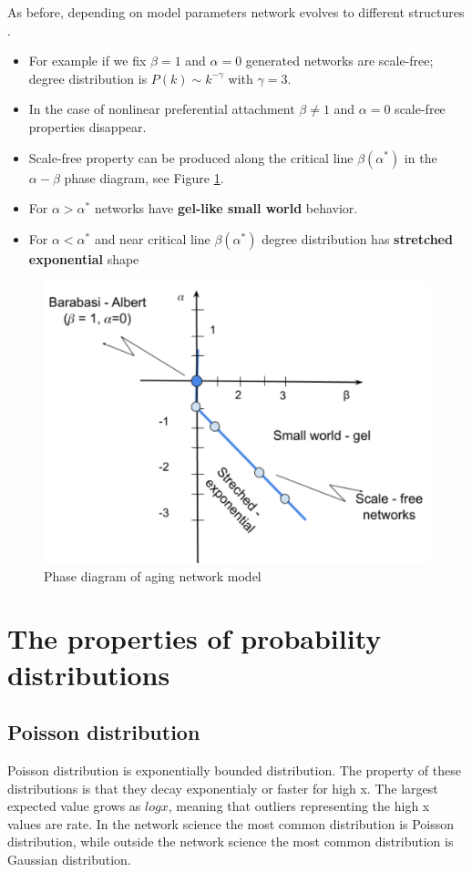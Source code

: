 As before, depending on model parameters network evolves to different structures \cite{hajra2004}.  
\begin{itemize}
	\item For example if we fix $\beta=1$ and $\alpha=0$ generated networks are scale-free; degree distribution is $P(k) \sim k^{-\gamma}$ with $\gamma=3$.
	\item In the case of nonlinear preferential attachment $\beta \neq 1$ and $\alpha=0$ scale-free properties disappear. 
	\item Scale-free property can be produced along the critical line $\beta(\alpha^{*})$ in the $\alpha-\beta$ phase diagram, see Figure \ref{fig:diagram}.
	
	\item For $\alpha>\alpha^{*}$ networks have \textbf{gel-like small world} behavior.
	
	\item For $\alpha<\alpha^{*}$ and near critical line $\beta(\alpha^{*})$ degree distribution has \textbf{stretched exponential} shape
	
\end{itemize}

\begin{figure}[!ht]
	\centering
	\includegraphics[width=0.5\linewidth]{Figures/diagram.png}
	\caption{Phase diagram of aging network model}
	\label{fig:diagram}
\end{figure}

\section{The properties of probability distributions}

\subsection{Poisson distribution}

Poisson distribution is exponentially bounded distribution. The property of these distributions is that they decay exponentialy or faster for high x. The largest expected value grows as $logx$, meaning that outliers representing the high x values are rate. In the network science the most common distribution is Poisson distribution, while outside the network science the most common distribution is Gaussian distribution. 

